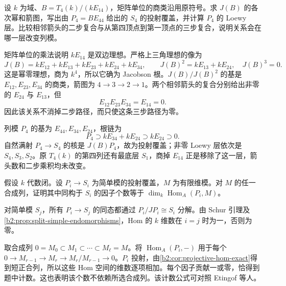 \begin{exercise}\label{b2:ex:15-quiver-with-zero-composition}
	设 \(k\) 为域、\(B=T_4(k)/(kE_{14})\)，矩阵单位的商类沿用原符号。求 \(J(B)\) 的各次幂和箭图，写出由 \(P_4=BE_{44}\) 给出的 \(S_4\) 的投射覆盖，并计算 \(P_4\) 的 Loewy 层。比较相邻箭头的二步复合与从第四顶点到第一顶点的三步复合，说明关系会在哪一层改变列模。
\end{exercise}
\begin{solution}
	矩阵单位的乘法说明 \(kE_{14}\) 是双边理想。严格上三角理想的像为
	\[
		J(B)=kE_{12}+kE_{13}+kE_{23}+kE_{24}+kE_{34},\qquad J(B)^2=kE_{13}+kE_{24},\quad J(B)^3=0.
	\]
	这是幂零理想，商为 \(k^4\)，所以它确为 Jacobson 根。\(J(B)/J(B)^2\) 的基是 \(E_{12},E_{23},E_{34}\) 的商类，箭图为 \(4\to3\to2\to1\)。两个相邻箭头的复合分别给出非零的 \(E_{24}\) 与 \(E_{13}\)，但
	\[
		E_{12}E_{23}E_{34}=E_{14}=0.
	\]
	因此该关系不消掉二步路径，而只使这条三步路径为零。

	列模 \(P_4\) 的基为 \(E_{44},E_{34},E_{24}\)，根链为
	\[
		P_4\supset kE_{34}+kE_{24}\supset kE_{24}\supset0.
	\]
	自然满射 \(P_4\to S_4\) 的核是 \(J(B)P_4\)，故为投射覆盖；非零 Loewy 层依次是 \(S_4,S_3,S_2\)。原 \(T_4(k)\) 的第四列还有最底层 \(S_1\)，商掉 \(E_{14}\) 正是移除了这一层，箭头数和二步乘积均未改变。
\end{solution}

\begin{exercise}\label{b2:ex:15-projective-hom-composition-factors}
	假设 \(k\) 代数闭。设 \(P_i\to S_i\) 为简单模的投射覆盖，\(M\) 为有限维模。对 \(M\) 的任一合成列，证明其中同构于 \(S_i\) 的因子个数等于 \(\dim_k\operatorname{Hom}_A(P_i,M)\)。
\end{exercise}
\begin{solution}
	对简单模 \(S_j\)，所有 \(P_i\to S_j\) 的同态都通过 \(P_i/JP_i\cong S_i\) 分解。由 Schur 引理及\cref{b2:prop:split-simple-endomorphisms}，Hom 的 \(k\) 维数在 \(i=j\) 时为一，否则为零。

	取合成列 \(0=M_0\subset M_1\subset\cdots\subset M_\ell=M\)。将 \(\operatorname{Hom}_A(P_i,-)\) 用于每个 \(0\to M_{r-1}\to M_r\to M_r/M_{r-1}\to0\)。\(P_i\) 投射，由\cref{b2:cor:projective-hom-exact}得到短正合列，所以这些 Hom 空间的维数逐项相加。每个因子贡献一或零，恰得到题中计数。这也表明该个数不依赖所选合成列。该计数公式可对照 Etingof 等人\cite[Proposition 9.2.3, p. 211]{EtingofEtAl2011RepresentationTheory}。
\end{solution}
